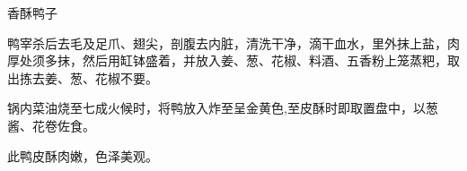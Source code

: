 \begin{recipe}{香酥鸭子}

\ingredients


\cooking

\step 鸭宰杀后去毛及足爪、翅尖，剖腹去内脏，清洗干净，滴干血水，里外抹上盐，肉厚处须多抹，然后用缸钵盛着，并放入姜、葱、花椒、料酒、五香粉上笼蒸粑，取出拣去姜、葱、花椒不要。

\step 锅内菜油烧至七成火候时，将鸭放入炸至呈金黄色,至皮酥时即取置盘中，以葱酱、花卷佐食。

\notes

此鸭皮酥肉嫩，色泽美观。

\end{recipe}


